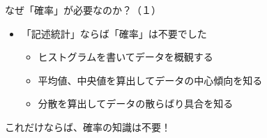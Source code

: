 \documentclass[dvipdfmx,cjk,handout]{beamer}
\begin{document}
\begin{frame}{なぜ「確率」が必要なのか？（１）}\pause


\begin{itemize}

    \item 「記述統計」ならば「確率」は不要でした
    \pause
        \begin{itemize}
        \item ヒストグラムを書いてデータを概観する
        \item 平均値、中央値を算出してデータの中心傾向を知る
        \item 分散を算出してデータの散らばり具合を知る
        \end{itemize}

\end{itemize}

\pause
\vskip 1cm
これだけならば、確率の知識は不要！

\end{frame}
\end{document}
